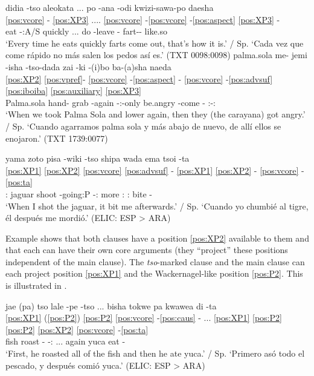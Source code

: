 \documentclass[output=paper,hidelinks]{langscibook}
\begin{document}
\ea 
 \ea\label{ex:tso...aleokata}
    \glll didia -tso aleokata ... po -ana -odi kwizi-sawa-po daesha \\
    \ref{pos:vcore} - \ref{pos:XP3} .... \ref{pos:vcore} -\ref{pos:vcore} -\ref{pos:aspect} \ref{pos:XP3} -  \\
    eat -\Prior{}:A/S quickly ... do -leave -\Freq{} fart-\Frust{}-\Nmlz{} like.so   \\
    \glt `Every time he eats quickly farts come out, that's how it is.' / Sp. `Cada vez que come rápido no más salen los pedos así es.'  \hfill (TXT 0098:0098)
 \ex \label{ex:tsodada}
    \glll palma.sola me- jemi -isha -tso-dada zai -ki -(i)bo ba-(a)sha naeda \\ 
    \ref{pos:XP2} \ref{pos:vpref}- \ref{pos:vcore} -\ref{pos:aspect} -  \ref{pos:vcore} -\ref{pos:advsuf} \ref{pos:iboiba} \ref{pos:auxiliary} \ref{pos:XP3}   \\
    Palma.sola hand- grab -again -\Prior{}:\Compl{}-only be.angry -come -\Pfv{} \Aux{}:\Vis{}-\Dist{}:\Pst{} \Tpl{}  \\
    \glt `When we took Palma Sola and lower again, then they (the carayana) got angry.' / Sp. `Cuando agarramos palma sola y más abajo de nuevo, de allí ellos se enojaron.'  \hfill (TXT 1739:0077)
 \z
\z 

\ea \label{ex:yama...ema}
    \glll yama zoto pisa -wiki -tso shipa wada ema tsoi -ta \\
    \ref{pos:XP1} \ref{pos:XP2} \ref{pos:vcore} \ref{pos:advsuf} - \ref{pos:XP1} \ref{pos:XP2} - \ref{pos:vcore} -\ref{pos:ta} \\
    \Fsg{}:\Erg{} jaguar shoot -going:P -\Prior{}:\Compl{} more \Tsg{}:\Erg{} \Fsg{}:\Abs{} bite -\Third\Aarg{}   \\
    \glt `When I shot the jaguar, it bit me afterwards.' / Sp. `Cuando yo chumbié al tigre, él después me mordió.'  \hfill (ELIC: ESP > ARA)
\z 


Example  shows that both clauses have a position \ref{pos:XP2} available to them and that each can have their own core arguments (they ``project'' these positions independent of the main clause). The \textit{tso}-marked clause and the main clause can each project position \ref{pos:XP1} and the Wackernagel-like position \ref{pos:P2}. This is illustrated in .

\ea \label{ex:patso...tokwepa}
    \glll jae (pa) tso lale -pe -tso ... bisha tokwe pa kwawea di -ta \\ 
    \ref{pos:XP1} (\ref{pos:P2}) \ref{pos:P2} \ref{pos:vcore} -\ref{pos:caus} - ... \ref{pos:XP1} \ref{pos:P2} \ref{pos:P2} \ref{pos:XP2} \ref{pos:vcore} -\ref{pos:ta}   \\
    fish \Rep{} \Ant{} roast -\Compl{} -\Prior{}:\Compl{} ... again \Epis{} \Rep{} yuca eat -\Third\Aarg{} \\
    \glt `First, he roasted all of the fish and then he ate yuca.' / Sp. `Primero asó todo el pescado, y después comió yuca.'   \hfill (ELIC: ESP > ARA)
\z 
\end{document}
